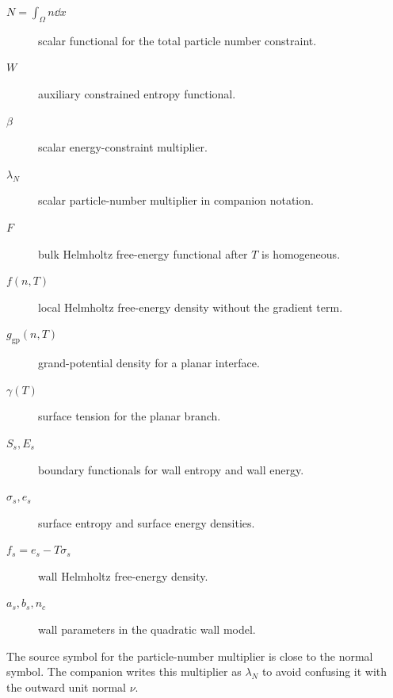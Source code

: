 \begin{description}
\item[\(N=\int_\Omega n\dd x\)] scalar functional for the total particle
  number constraint.
\item[\(W\)] auxiliary constrained entropy functional.
\item[\(\beta\)] scalar energy-constraint multiplier.
\item[\(\lambda_N\)] scalar particle-number multiplier in companion notation.
\item[\(F\)] bulk Helmholtz free-energy functional after \(T\) is homogeneous.
\item[\(f(n,T)\)] local Helmholtz free-energy density without the gradient
  term.
\item[\(g_{\mathrm{gp}}(n,T)\)] grand-potential density for a planar interface.
\item[\(\gamma(T)\)] surface tension for the planar branch.
\item[\(S_s,E_s\)] boundary functionals for wall entropy and wall energy.
\item[\(\sigma_s,e_s\)] surface entropy and surface energy densities.
\item[\(f_s=e_s-T\sigma_s\)] wall Helmholtz free-energy density.
\item[\(a_s,b_s,n_c\)] wall parameters in the quadratic wall model.
\end{description}

The source symbol for the particle-number multiplier is close to the normal
symbol.  The companion writes this multiplier as \(\lambda_N\) to avoid
confusing it with the outward unit normal \(\nu\).

